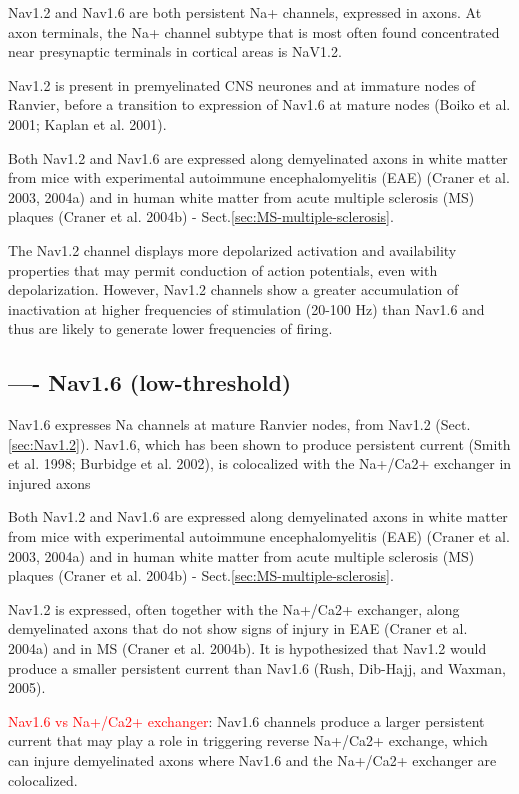 Nav1.2 and Nav1.6 are both persistent Na+ channels, expressed in axons.
At axon terminals, the Na+ channel subtype that is most often found concentrated
near presynaptic terminals in cortical areas is NaV1.2.

Nav1.2 is present in premyelinated CNS neurones and at immature nodes of
Ranvier, before a transition to expression of Nav1.6 at mature nodes (Boiko et
al. 2001; Kaplan et al. 2001).

Both Nav1.2 and Nav1.6 are expressed along demyelinated axons in white matter
from mice with experimental autoimmune encephalomyelitis (EAE) (Craner et al.
2003, 2004a) and in human white matter from acute multiple sclerosis (MS)
plaques (Craner et al. 2004b) - Sect.\ref{sec:MS-multiple-sclerosis}.

The Nav1.2 channel displays more depolarized activation and availability
properties that may permit conduction of action potentials, even with
depolarization. However, Nav1.2 channels show a greater accumulation of
inactivation at higher frequencies of stimulation (20-100 Hz) than Nav1.6 and
thus are likely to generate lower frequencies of firing.

\subsection{---- Nav1.6 (low-threshold)}
\label{sec:Nav1.6}

Nav1.6 expresses Na channels at mature Ranvier nodes, from Nav1.2
(Sect.\ref{sec:Nav1.2}). Nav1.6, which has been shown to produce persistent
current (Smith et al.
1998; Burbidge et al. 2002), is colocalized with the Na+/Ca2+ exchanger in
injured axons

Both Nav1.2 and Nav1.6 are expressed along demyelinated axons in white matter
from mice with experimental autoimmune encephalomyelitis (EAE) (Craner et al.
2003, 2004a) and in human white matter from acute multiple sclerosis (MS)
plaques (Craner et al. 2004b) - Sect.\ref{sec:MS-multiple-sclerosis}.

Nav1.2 is expressed, often together with the Na+/Ca2+ exchanger, along
demyelinated axons that do not show signs of injury in EAE (Craner et al. 2004a)
and in MS (Craner et al.
2004b). It is hypothesized that Nav1.2 would produce a smaller persistent
current than Nav1.6 (Rush, Dib-Hajj, and Waxman, 2005). 

\textcolor{red}{Nav1.6 vs Na+/Ca2+ exchanger}: Nav1.6 channels produce a larger
persistent current that may play a role in triggering reverse Na+/Ca2+ exchange,
which can injure demyelinated axons where Nav1.6 and the Na+/Ca2+ exchanger are
colocalized.



